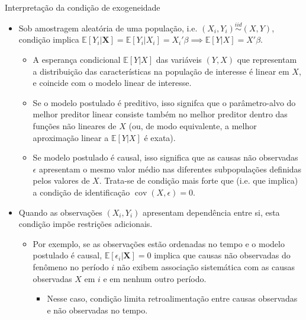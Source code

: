 \documentclass[11pt]{beamer}
\begin{document}
\begin{frame}{Interpretação da condição de exogeneidade}
\begin{itemize}


		\item Sob amostragem aleatória de uma população, i.e. $(X_i,Y_i)\overset{iid}{\sim}(X,Y)$, condição implica $\mathbb{E}[Y_i|\boldsymbol{X}] = \mathbb{E}[Y_i|X_i] = X_i'\beta \implies \mathbb{E}[Y|X]=X'\beta$.
		\begin{itemize}
			\item A esperança condicional $\mathbb{E}[Y|X]$ das variáveis $(Y,X)$ que representam a distribuição das características na população de interesse é linear em $X$, {\color{green}e coincide com o modelo linear de interesse}.
				\item Se o modelo postulado é {\color{blue}preditivo}, isso signifca que o parâmetro-alvo do melhor preditor linear consiste também no melhor preditor dentro das funções não lineares de $X$ (ou, de modo equivalente, a melhor aproximação linear a $\mathbb{E}[Y|X]$ é exata).
				\item Se modelo postulado é {\color{blue}causal}, isso significa que as causas não observadas $\epsilon$ apresentam o mesmo valor médio nas diferentes subpopulações definidas pelos valores de $X$. Trata-se de condição mais forte que (i.e. que implica) a condição de identificação $\operatorname{cov}(X,\epsilon) = 0$.
		\end{itemize}
					\item Quando as observações $(X_i,Y_i)$  apresentam dependência entre si, esta condição impõe restrições adicionais.
					\begin{itemize}
						\item Por exemplo, se as observações estão ordenadas no tempo e o modelo postulado é causal, $\mathbb{E}[\epsilon_i|\boldsymbol{X}]=0$ implica que causas não observadas  do fenômeno no período $i$ não exibem associação sistemática com as causas observadas $X$ em $i$ {\color{red}e em nenhum outro período}.
						\begin{itemize}
							\item Nesse caso, condição limita retroalimentação entre causas observadas e não observadas no tempo.
						\end{itemize}
					\end{itemize} 
	\end{itemize}

\end{frame}
\end{document}
